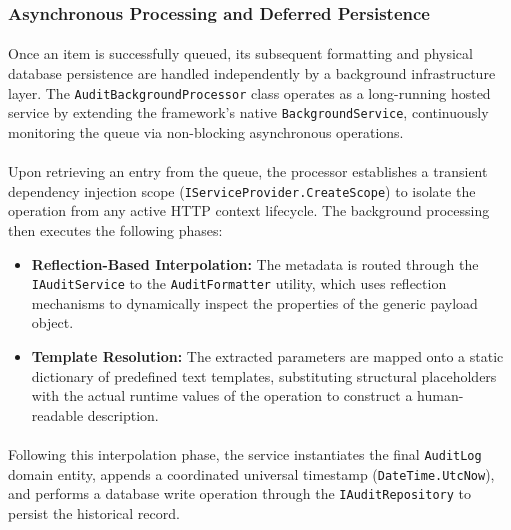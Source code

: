 \subsubsection{Asynchronous Processing and Deferred Persistence}
\paragraph{}Once an item is successfully queued, its subsequent formatting and physical database persistence are handled independently by a background infrastructure layer. The \texttt{AuditBackgroundProcessor} class operates as a long-running hosted service by extending the framework's native \texttt{BackgroundService}, continuously monitoring the queue via non-blocking asynchronous operations.

\paragraph{}Upon retrieving an entry from the queue, the processor establishes a transient dependency injection scope (\texttt{IServiceProvider.CreateScope}) to isolate the operation from any active HTTP context lifecycle. The background processing then executes the following phases:
\begin{itemize}
    \item \textbf{Reflection-Based Interpolation:} The metadata is routed through the \texttt{IAuditService} to the \texttt{AuditFormatter} utility, which uses reflection mechanisms to dynamically inspect the properties of the generic payload object.
    \item \textbf{Template Resolution:} The extracted parameters are mapped onto a static dictionary of predefined text templates, substituting structural placeholders with the actual runtime values of the operation to construct a human-readable description.
\end{itemize}
\paragraph{}Following this interpolation phase, the service instantiates the final \texttt{AuditLog} domain entity, appends a coordinated universal timestamp (\texttt{DateTime.UtcNow}), and performs a database write operation through the \texttt{IAuditRepository} to persist the historical record.
